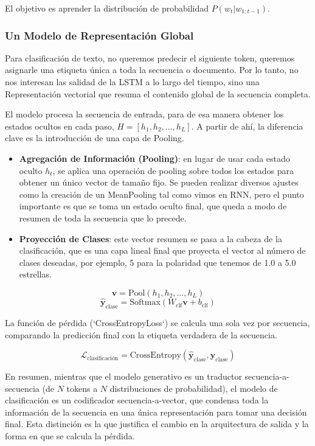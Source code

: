 El objetivo es aprender la distribución de probabilidad $P(w_t | w_{1:t-1})$.

\subsubsection{Un Modelo de Representación Global}

Para clasificación de texto, no queremos predecir el siguiente token, queremos 
asignarle una etiqueta única a toda la secuencia o documento. Por lo tanto, no
nos interesan las salidad de la LSTM a lo largo del tiempo, sino una Representación
vectorial que resuma el contenido global de la secuencia completa. 

El modelo procesa la secuencia de entrada, para de esa manera obtener los estados
ocultos en cada paso, $H = [h_1, h_2,...,h_L]$. A partir de ahí, la diferencia
clave es la introducción de una capa de Pooling. 

\begin{itemize}
    \item \textbf{Agregación de Información (Pooling)}: en lugar de usar cada
    estado oculto $h_t$, se aplica una operación de pooling sobre todos los estados
    para obtener un único vector de tamaño fijo. Se pueden realizar diversos ajustes
    como la creación de un MeanPooling tal como vimos en RNN, pero el punto importante
    es que se toma un estado oculto final, que queda a modo de resumen de toda la
    secuencia que lo precede.
    \item \textbf{Proyección de Clases}: este vector resumen se pasa a la cabeza de la 
    clasificación, que es una capa lineal final que proyecta el vector al número de 
    clases deseadas, por ejemplo, 5 para la polaridad que tenemos de 1.0 a 5.0 estrellas.
\end{itemize}

\[
    \mathbf{v} = \mathrm{Pool}(h_1, h_2, \dots, h_L)
\]
\[
    \hat{\mathbf{y}}_{\text{clase}} = \mathrm{Softmax}(W_{\text{clf}} \mathbf{v} + b_{\text{clf}})
\]

La función de pérdida (`CrossEntropyLoss`) se calcula una sola vez por 
secuencia, comparando la predicción final con la etiqueta verdadera de
la secuencia.

\[
    \mathcal{L}_{\text{clasificación}} = \mathrm{CrossEntropy}(\hat{\mathbf{y}}_{\text{clase}}, \mathbf{y}_{\text{clase}})
\]

En resumen, mientras que el modelo generativo es un traductor 
secuencia-a-secuencia (de $N$ tokens a $N$ distribuciones de probabilidad), 
el modelo de clasificación es un codificador secuencia-a-vector, que condensa
toda la información de la secuencia en una única representación para tomar 
una decisión final. Esta distinción es la que justifica el cambio en la
arquitectura de salida y la forma en que se calcula la pérdida.

